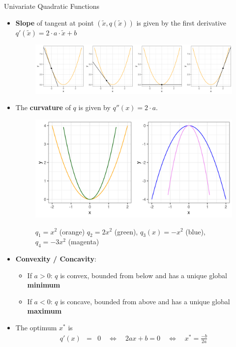 \documentclass[11pt,compress,t,notes=noshow, xcolor=table]{beamer}
\begin{document}
\begin{vbframe}{Univariate Quadratic Functions}
  \begin{itemize}
    \item \textbf{Slope} of tangent at point $(\tilde x, q(\tilde x))$ is given by the first derivative $q'(\tilde x) = 2 \cdot a \cdot \tilde x + b$
    \begin{figure}
    \includegraphics[height=0.2\textwidth, keepaspectratio]{figure_man/quadratic_functions_1D_derivative.png} \\
    \begin{footnotesize} 
    \end{footnotesize}
    \end{figure}
     \item The \textbf{curvature} of $q$ is given by $q''(x) = 2\cdot a$. 
    \begin{figure}
    \includegraphics[height=0.2\textwidth, keepaspectratio]{figure_man/quadratic_functions_1D_curvature.png} \\
    \begin{footnotesize} 
     $q_1 = x^2$ (orange) $q_2 = 2 x^2$ (green), $q_3 (x) = - x^2$ (blue), $q_4 = - 3 x^2$ (magenta)
    \end{footnotesize}
    \end{figure}
  
    \item \textbf{Convexity / Concavity}: 
  
    \begin{itemize}
      \item If $a > 0$: $q$ is convex, bounded from below and has a unique global \textbf{minimum}
      \item If $a < 0$: $q$ is concave, bounded from above and has a unique global \textbf{maximum}
    \end{itemize}
  
    \item The optimum $x^\ast$ is 
    \begin{eqnarray*}
      q'(x) &=& 0 \quad\Leftrightarrow \quad 2ax + b = 0 \quad \Leftrightarrow \quad x^\ast = \frac{-b}{2a}  	
    \end{eqnarray*}
  \end{itemize}
  

\end{vbframe}
\end{document}
